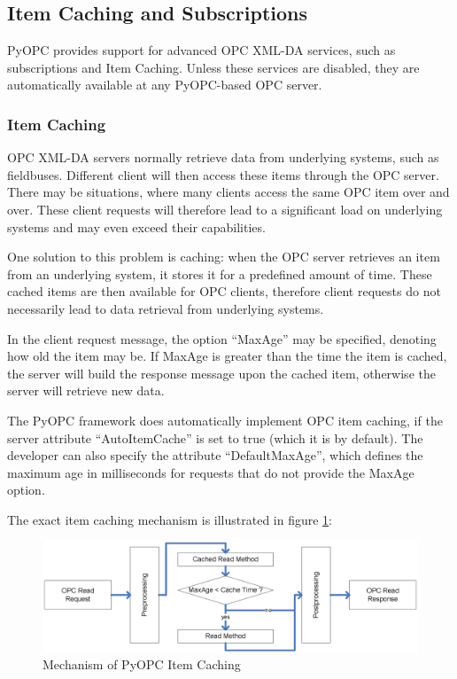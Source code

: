 \subsection{Item Caching and Subscriptions}

PyOPC provides support for advanced OPC XML-DA services, such as 
subscriptions and Item Caching. Unless these services are disabled,
they are automatically available at any PyOPC-based OPC server.

\subsubsection*{Item Caching}

OPC XML-DA servers normally retrieve data from underlying systems,
such as fieldbuses. Different client will then access these items
through the OPC server. There may be situations, where many clients
access the same OPC item over and over. These client requests will
therefore lead to a significant load on underlying systems and may
even exceed their capabilities.

One solution to this problem is caching: when the OPC server retrieves
an item from an underlying system, it stores it for a predefined amount
of time. These cached items are then available for OPC clients, therefore
client requests do not necessarily lead to data retrieval from underlying
systems.

In the client request message, the option ``MaxAge'' may be specified,
denoting how old the item may be. If MaxAge is greater than the time
the item is cached, the server will build the response message upon
the cached item, otherwise the server will retrieve new data.

The PyOPC framework does automatically implement OPC item caching, if
the server attribute ``AutoItemCache'' is set to true (which it is by
default). The developer can also specify the attribute
``DefaultMaxAge'', which defines the maximum age in milliseconds for
requests that do not provide the MaxAge option.

The exact item caching mechanism is illustrated in figure
\ref{item_caching}:

\begin{figure}[ht]
\centering
\includegraphics[scale=0.7]{graphics/item_caching.eps}
\caption{Mechanism of PyOPC Item Caching}
\label {item_caching} 
\end{figure}

